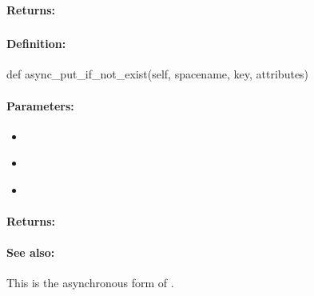 \paragraph{Returns:}


\pagebreak
\subsubsection{}
\label{api:python:async_put_if_not_exist}


\paragraph{Definition:}
\begin{pythoncode}
def async_put_if_not_exist(self, spacename, key, attributes)
\end{pythoncode}

\paragraph{Parameters:}
\begin{itemize}[noitemsep]
\item {}\\

\item {}\\

\item {}\\

\end{itemize}

\paragraph{Returns:}


\paragraph{See also:}  This is the asynchronous form of .

\pagebreak
\subsubsection{}
\label{api:python:del}


